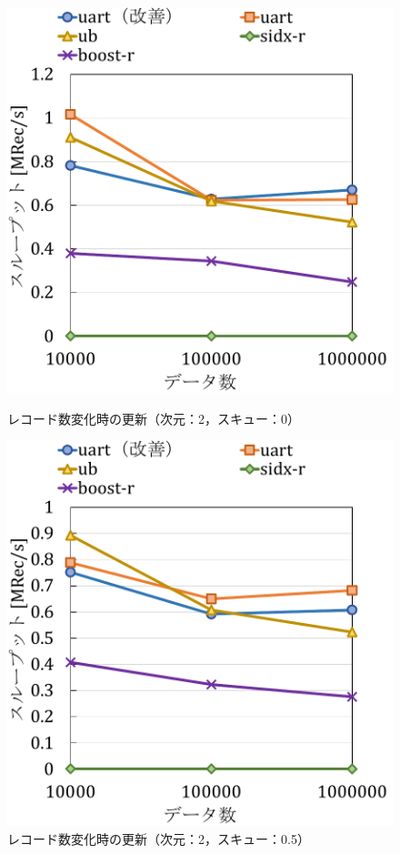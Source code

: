 \begin{figure}[tb]
  \begin{minipage}[c]{0.495\textwidth}
    \centering
    \includegraphics[scale=0.45]{./figures/graph-record-update-2-0.pdf}
    \caption{レコード数変化時の更新（次元：2，スキュー：0）}
    \label{graph:rec-upd-2-0}
  \end{minipage}
  \begin{minipage}[c]{0.495\textwidth}
    \centering
    \includegraphics[scale=0.45]{./figures/graph-record-update-2-0.5.pdf}
    \caption{レコード数変化時の更新（次元：2，スキュー：0.5）}
    \label{graph:rec-upd-2-0.5}
  \end{minipage}
\end{figure}

